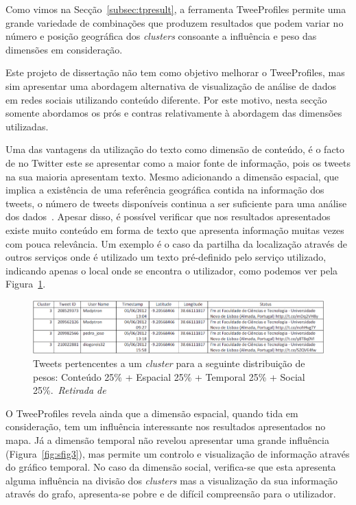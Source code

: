 Como vimos na Secção~\ref{subsec:tpresult}, a ferramenta TweeProfiles permite uma grande variedade de combinações que produzem resultados que podem variar no número e posição geográfica dos \textit{clusters} consoante a influência e peso das dimensões em consideração. 

Este projeto de dissertação não tem como objetivo melhorar o TweeProfiles, mas sim apresentar uma abordagem alternativa de visualização de análise de dados em redes sociais utilizando conteúdo diferente. Por este motivo, nesta secção somente abordamos os prós e contras relativamente à abordagem das dimensões utilizadas.

Uma das vantagens da utilização do texto como dimensão de conteúdo, é o facto de no Twitter este se apresentar como a maior fonte de informação, pois os tweets na sua maioria apresentam texto. Mesmo adicionando a dimensão espacial, que implica a existência de uma referência geográfica contida na informação dos tweets, o número de tweets disponíveis continua a ser suficiente para uma análise dos dados~\cite{Cunha2013}. Apesar disso, é possível verificar que nos resultados apresentados existe muito conteúdo em forma de texto que apresenta informação muitas vezes com pouca relevância. Um exemplo é o caso da partilha da localização através de outros serviços onde é utilizado um texto pré-definido pelo serviço utilizado, indicando apenas o local onde se encontra o utilizador, como podemos ver pela Figura~\ref{fig:tweepex4}.

\begin{figure}[!h]
\centering
\includegraphics[width=1.0\linewidth]{./figures/tweeprofiles/extp7.png}
\caption{Tweets pertencentes a um \textit{cluster} para a seguinte distribuição de pesos: Conteúdo 25\% + Espacial 25\% + Temporal 25\% + Social 25\%.~\textit{Retirada de}~\cite{Cunha2013}}
\label{fig:tweepex4}
\end{figure}

O TweeProfiles revela ainda que a dimensão espacial, quando tida em consideração, tem um influência interessante nos resultados apresentados no mapa. Já a dimensão temporal não revelou apresentar uma grande influência (Figura~\ref{fig:sfig3}), mas permite um controlo e visualização de informação através do gráfico temporal. No caso da dimensão social, verifica-se que esta apresenta alguma influência na divisão dos \textit{clusters} mas a visualização da sua informação através do grafo, apresenta-se pobre e de difícil compreensão para o utilizador.

